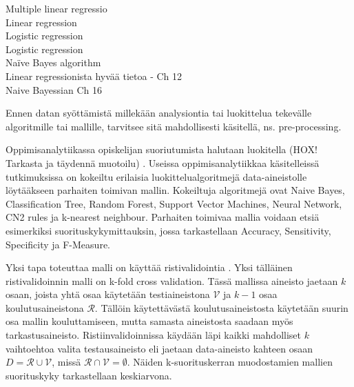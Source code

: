 
Multiple linear regressio \cite{agudo-peregrinaCanWePredict2014} \\
Linear regression \cite{tempelaarSearchMostInformative2015} \\
Logistic regression \cite{barberCourseCorrectionUsing2012} \\
Logistic regression \cite{garmanLogisticApproachPredicting2010} \\
Naïve Bayes algorithm \cite{barberCourseCorrectionUsing2012} \\


Linear regressionista hyvää tietoa \cite{rossIntroductoryStatistics2017} - Ch 12 \\
Naive Bayessian Ch 16


Ennen datan syöttämistä millekään analysiontia tai luokittelua tekevälle algoritmille tai mallille, tarvitsee sitä mahdollisesti käsitellä, ns. pre-processing.

\color{black}
\color{green}
Oppimisanalytiikassa opiskelijan suoriutumista halutaan luokitella (HOX! Tarkasta ja täydennä muotoilu) \cite{akcapinarUsingLearningAnalytics2019}. Useissa oppimisanalytiikkaa käsitelleissä tutkimuksissa on kokeiltu erilaisia luokittelualgoritmejä data-aineistolle löytääkseen parhaiten toimivan mallin. Kokeiltuja algoritmejä ovat Naive Bayes, Classification Tree, Random Forest, Support Vector Machines, Neural Network, CN2 rules ja k-nearest neighbour. Parhaiten toimivaa mallia voidaan etsiä esimerkiksi suorituskykymittauksin, jossa tarkastellaan Accuracy, Sensitivity, Specificity ja F-Measure. 

Yksi tapa toteuttaa malli on käyttää ristivalidointia \cite{deisenrothMathematicsMachineLearning}. Yksi tälläinen ristivalidoinnin malli on k-fold cross validation. Tässä mallissa aineisto jaetaan $k$ osaan, joista yhtä osaa käytetään testiaineistona $\mathcal{V}$ ja $k-1$ osaa koulutusaineistona $\mathcal{R}$. Tällöin käytettävästä koulutusaineistosta käytetään suurin osa mallin kouluttamiseen, mutta samasta aineistosta saadaan myös tarkastusaineisto. Ristiinvalidoinnissa käydään läpi kaikki mahdolliset $k$ vaihtoehtoa valita testausaineisto eli jaetaan data-aineisto kahteen osaan $D = \mathcal{R} \cup \mathcal{V}$, missä $\mathcal{R} \cap \mathcal{V} = \emptyset$. Näiden k-suorituskerran muodostamien mallien suorituskyky tarkastellaan keskiarvona.



